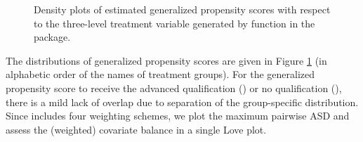 \begin{figure}[!ht]
\centering
    \hspace{-5mm}
\caption{\label{fig:propdmult}
Density plots of estimated generalized propensity scores with respect to the three-level treatment variable  generated by  function in the  package.}
\end{figure}

The distributions of generalized propensity scores are given in Figure \ref{fig:propdmult} (in alphabetic order of the names of treatment groups). For the generalized propensity score to receive the advanced qualification () or no qualification (), there is a mild lack of overlap due to separation of the group-specific distribution. Since  includes four weighting schemes, we plot the maximum pairwise ASD and assess the (weighted) covariate balance in a single Love plot. 

